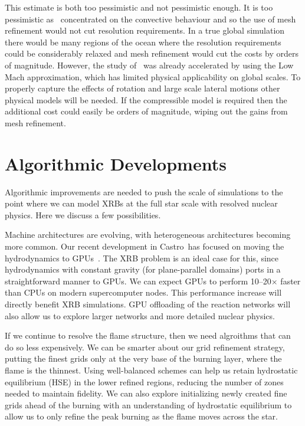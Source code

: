 \documentclass[a4paper]{jpconf}
\newcommand{\castro}{{\sffamily Castro}}
\begin{document}
This estimate is both too pessimistic and not pessimistic enough. It is too
pessimistic as~\cite{xrb3} concentrated on the convective behaviour and so the
use of mesh refinement would not cut resolution requirements. In a true global
simulation there would be many regions of the ocean where the resolution
requirements could be considerably relaxed and mesh refinement would cut the
costs by orders of magnitude. However, the study of~\cite{xrb3} was already
accelerated by using the Low Mach approximation, which has limited physical
applicability on global scales. To properly capture the effects of rotation and
large scale lateral motions other physical models will be needed. If the
compressible model is required then the additional cost could easily be orders
of magnitude, wiping out the gains from mesh refinement.

\section{Algorithmic Developments}

Algorithmic improvements are needed to push the scale of simulations
to the point where we can model XRBs at the full star scale with
resolved nuclear physics.  Here we discuss a few possibilities.

Machine architectures are evolving, with heterogeneous architectures
becoming more common.  Our recent development in \castro\ has focused
on moving the hydrodynamics to GPUs~\cite{astronum:2017}.  The XRB
problem is an ideal case for this, since hydrodynamics with constant
gravity (for plane-parallel domains) ports in a straightforward manner
to GPUs.  We can expect GPUs to perform 10--20$\times$ faster than
CPUs on modern supercomputer nodes.  This performance increase will
directly benefit XRB simulations.  GPU offloading of the reaction networks
will also allow us to explore larger networks and more detailed nuclear
physics.

If we continue to resolve the flame structure, then we need algroithms
that can do so less expensively.  We can be smarter about our grid
refinement strategy, putting the finest grids only at the very base of
the burning layer, where the flame is the thinnest.  Using
well-balanced schemes can help us retain hydrostatic equilibrium (HSE)
in the lower refined regions, reducing the number of zones needed to
maintain fidelity.  We can also explore initializing newly created fine
grids ahead of the burning with an understanding of hydrostatic
equilibrium to allow us to only refine the peak burning as the flame
moves across the star.
\end{document}
